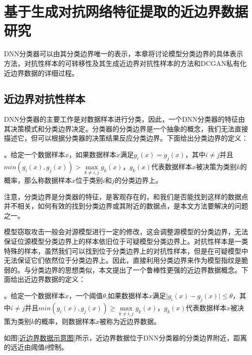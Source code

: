 
\chapter{基于生成对抗网络特征提取的近边界数据研究}\label{3}

DNN分类器可以由其分类边界唯一的表示，本章将讨论模型分类边界的具体表示方法，对抗性样本的可转移性及其生成近边界对抗性样本的方法和DCGAN私有化近边界数据的详细过程。

\section{近边界对抗性样本}

DNN分类器的主要工作是对数据样本进行分类，因此，一个DNN分类器的特征由其决策模式和分类边界决定。分类器的分类边界是一个抽象的概念，我们无法直接描述它，但可以根据分类器的决策结果反应分类边界。下面给出分类边界的定义：

\begin{myDef}
	\label{def:1}
	。给定一个数据样本$x$，如果数据样本$x$满足$g_i(x) = g_j(x)$，其中$i \neq j $并且$min(g_i(x), g_j(x)) > \mathop{max} \limits_{k \neq i, j}g_k(x)$，$g_k(x)$代表数据样本$x$被决策为类别$k$的概率，那么称数据样本$x$位于类别$i$和$j$的分类边界上。
\end{myDef}
注意，分类边界是分类器的特征，是客观存在的，和我们是否能找到这样的数据点并不相关，如何有效的找到分类边界或其附近的数据点，是本文方法要解决的问题之一。

模型窃取攻击一般会对源模型进行一定的修改，这会调整源模型的分类边界，无法保证位源模型分类边界上的样本依旧位于可疑模型分类边界上。对抗性样本是一类特殊的样本，虽然我们可以找到位于分类边界上的对抗性样本，但是在可疑模型中无法保证它们依然位于分类边界上。因此，直接利用分类边界来作为模型指纹是脆弱的。与分类边界的思想类似，本文提出了一个鲁棒性更强的近边界数据概念。下面给出近边界数据的定义：

\begin{myDef}
	\label{def:2}
	。给定一个数据样本$x$，一个阈值$\theta$,如果数据样本$x$满足$\vert g_i(x) - g_j(x) \vert \leq \theta$，其中$i \neq j $并且$min(g_i(x), g_j(x)) \geq \mathop{max} \limits_{k \neq i, j}g_k(x)$，$g_k(x)$代表数据样本$x$被决策为类别$k$的概率，则数据样本$x$被称为近边界数据。
\end{myDef}

如图\ref{近边界数据示意图}所示，近边界数据位于DNN分类器的分类边界附近，距离的远近由阈值$\theta$控制。

